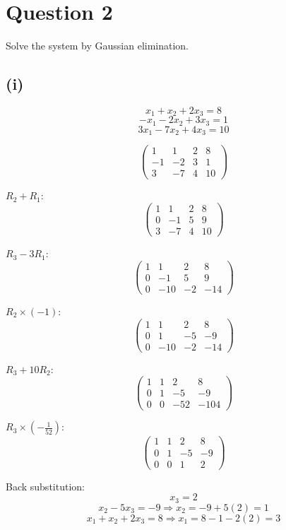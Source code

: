 \documentclass[12pt]{article}
\begin{document}
\section*{Question 2}
Solve the system by Gaussian elimination.

\subsection*{(i)}
\[
	x_1 + x_2 + 2x_3 = 8
\]
\[
	-x_1 - 2x_2 + 3x_3 = 1
\]
\[
	3x_1 - 7x_2 + 4x_3 = 10
\]

\[
	\begin{pmatrix}
		1  & 1  & 2 & 8  \\
		-1 & -2 & 3 & 1  \\
		3  & -7 & 4 & 10
	\end{pmatrix}
\]

$R_2 + R_1$:
\[
	\begin{pmatrix}
		1 & 1   & 2  & 8   \\
		0 & -1  & 5  & 9   \\
		3  & -7 & 4 & 10
	\end{pmatrix}
\]

$R_3 - 3R_1$:
\[
	\begin{pmatrix}
		1 & 1   & 2  & 8   \\
		0 & -1  & 5  & 9   \\
		0 & -10 & -2 & -14
	\end{pmatrix}
\]

$R_2 \times (-1)$:
\[
	\begin{pmatrix}
		1 & 1   & 2  & 8   \\
		0 & 1   & -5 & -9  \\
		0 & -10 & -2 & -14
	\end{pmatrix}
\]

$R_3 + 10R_2$:
\[
	\begin{pmatrix}
		1 & 1 & 2   & 8    \\
		0 & 1 & -5  & -9   \\
		0 & 0 & -52 & -104
	\end{pmatrix}
\]

$R_3 \times (-\frac{1}{52})$:
\[
	\begin{pmatrix}
		1 & 1 & 2  & 8  \\
		0 & 1 & -5 & -9 \\
		0 & 0 & 1  & 2
	\end{pmatrix}
\]

Back substitution:
\[
	x_3 = 2
\]
\[
	x_2 - 5x_3 = -9 \Rightarrow x_2 = -9 + 5(2) = 1
\]
\[
	x_1 + x_2 + 2x_3 = 8 \Rightarrow x_1 = 8 - 1 - 2(2) = 3
\]
\end{document}
